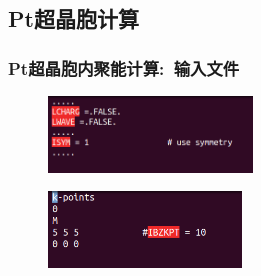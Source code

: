 \subsection{{\rm Pt}超晶胞计算}\label{Sec:bulk-Pt}
\frame
{
	\frametitle{\textrm{Pt}超晶胞内聚能计算:~输入文件}
	{\fontsize{7.4pt}{5.2pt}}
\begin{figure}[h!]
\centering
\includegraphics[height=0.8in,viewport=0 20 340 118,clip]{Figures/Pt_Bulk-INCAR.png}
\caption{\fontsize{6.2pt}{5.2pt}}%
\label{Pt_Bulk-INCAR-modified-1}
\end{figure}
\begin{figure}[h!]
\centering
\vskip -3pt
\includegraphics[height=0.8in,viewport=0 20 240 108,clip]{Figures/Pt_Bulk-KPOINTS.png}
\caption{\fontsize{6.2pt}{5.2pt}}%
\label{Pt_Bulk-KPOINTS}
\end{figure}
{\fontsize{6.2pt}{5.2pt}}%
}


